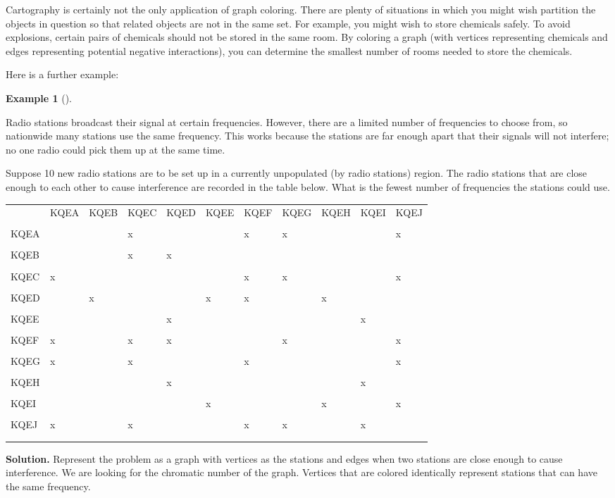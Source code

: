 \documentclass[10pt,]{book}
\theoremstyle{plain}
\theoremstyle{definition}
\newtheorem{example}[theorem]{Example}
\theoremstyle{definition}
\theoremstyle{definition}
\numberwithin{equation}{chapter}
\newcommand{\hrulethin}  {\noalign{\hrule height 0.04em}}
\begin{document}
Cartography is certainly not the only application of graph coloring. There are plenty of situations in which you might wish partition the objects in question so that related objects are not in the same set. For example, you might wish to store chemicals safely. To avoid explosions, certain pairs of chemicals should not be stored in the same room. By coloring a graph (with vertices representing chemicals and edges representing potential negative interactions), you can determine the smallest number of rooms needed to store the chemicals.
%
\par

Here is a further example:
%
\begin{example}[]\label{example-106}

Radio stations broadcast their signal at certain frequencies. However, there are a limited number of frequencies to choose from, so nationwide many stations use the same frequency. This works because the stations are far enough apart that their signals will not interfere; no one radio could pick them up at the same time.
%
\par

Suppose 10 new radio stations are to be set up in a currently unpopulated (by radio stations) region. The radio stations that are close enough to each other to cause interference are recorded in the table below. What is the fewest number of frequencies the stations could use.
%
\begin{tabular}{lllllllllll}
&{ KQEA}&{ KQEB}&{ KQEC}&{ KQED}&{ KQEE}&{ KQEF}&{ KQEG}&{  KQEH}&{  KQEI}&{ KQEJ }\tabularnewline[0pt]
&&&&&&&&&&\tabularnewline\hrulethin
{ KQEA }&&&x&&&x&x&&&x\tabularnewline[0pt]
&&&&&&&&&&\tabularnewline\hrulethin
{ KQEB }&&&x&x&&&&&&\tabularnewline[0pt]
&&&&&&&&&&\tabularnewline\hrulethin
{ KQEC }&x&&&&&x&x&&&x\tabularnewline[0pt]
&&&&&&&&&&\tabularnewline\hrulethin
{ KQED }&&x&&&x&x&&x&&\tabularnewline[0pt]
&&&&&&&&&&\tabularnewline\hrulethin
{ KQEE }&&&&x&&&&&x&\tabularnewline[0pt]
&&&&&&&&&&\tabularnewline\hrulethin
{ KQEF }&x&&x&x&&&x&&&x\tabularnewline[0pt]
&&&&&&&&&&\tabularnewline\hrulethin
{ KQEG }&x&&x&&&x&&&&x\tabularnewline[0pt]
&&&&&&&&&&\tabularnewline\hrulethin
{ KQEH }&&&&x&&&&&x&\tabularnewline[0pt]
&&&&&&&&&&\tabularnewline\hrulethin
{ KQEI }&&&&&x&&&x&&x\tabularnewline[0pt]
&&&&&&&&&&\tabularnewline\hrulethin
{ KQEJ }&x&&x&&&x&x&&x&\tabularnewline[0pt]
&&&&&&&&&&\tabularnewline\hrulethin
\end{tabular}
\par\medskip\noindent%
\textbf{Solution.}\quad
Represent the problem as a graph with vertices as the stations and edges when two stations are close enough to cause interference. We are looking for the chromatic number of the graph. Vertices that are colored identically represent stations that can have the same frequency.
%
\par


\end{example}
\end{document}
